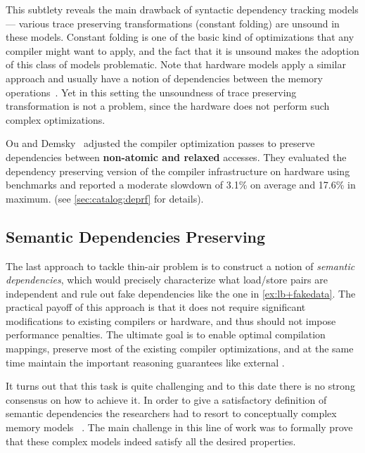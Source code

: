 This subtlety reveals the main drawback of 
syntactic dependency tracking models --- 
various trace preserving transformations
(\eg constant folding) are unsound in these models. 
Constant folding is one of the basic kind of optimizations that 
any compiler might want to apply, 
and the fact that it is unsound  
makes the adoption of this class of models problematic.
Note that hardware models apply a similar approach 
and usually have a notion of dependencies between 
the memory operations~\cite{Sarkar-al:PLDI11, Alglave-al:TOPLAS14, Pulte-al:POPL18}.
Yet in this setting the unsoundness of 
trace preserving transformation is not a problem,
since the hardware does not perform such complex optimizations.

Ou and Demsky~\cite{Ou-Demsky:OOPSLA18} adjusted 
the compiler optimization passes to preserve
dependencies between \textbf{non-atomic and relaxed} accesses.
They evaluated the dependency preserving 
version of the \LLVM compiler infrastructure 
on  hardware using \SPECCPU benchmarks
and reported a moderate slowdown of 
3.1\% on average and 17.6\% in maximum. 
(see \ref{sec:catalog:deprf} for details).

\subsection{Semantic Dependencies Preserving}
\label{sec:analysis:sdeprf}

The last approach to tackle thin-air problem is to   
construct a notion of \emph{semantic dependencies}, 
which would precisely characterize what load/store 
pairs are independent and rule out fake dependencies 
like the one in \ref{ex:lb+fakedata}.
The practical payoff of this approach is that it 
does not require significant modifications to existing compilers or hardware, 
and thus should not impose performance penalties.  
The ultimate goal is to enable optimal compilation mappings, 
preserve most of the existing compiler optimizations, 
and at the same time maintain the important 
reasoning guarantees like external \DRF. 

It turns out that this task is quite challenging 
and to this date there is no strong consensus on how to achieve it.
In order to give a satisfactory definition of semantic dependencies 
the researchers had to resort to conceptually complex memory models%
~\cite{Jagadeesan-al:ESOP10, Kang-al:POPL17, Jeffrey-Riely:LICS16, 
PichonPharabod-Sewell:POPL16, Chakraborty-Vafeiadis:POPL19, Paviotti-al:ESOP20}.
The main challenge in this line of work was to formally prove 
that these complex models indeed satisfy all the desired properties. 

